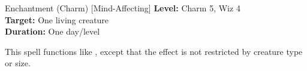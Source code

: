 {Enchantment (Charm) [Mind-Affecting]}
{
	\textbf{Level:}
	Charm 5, Wiz 4\\
	\textbf{Target:}
	One living creature\\
	\textbf{Duration:}
	One day/level\\
}
{
	This spell functions like , except that the effect is not restricted by creature type or size.

}
